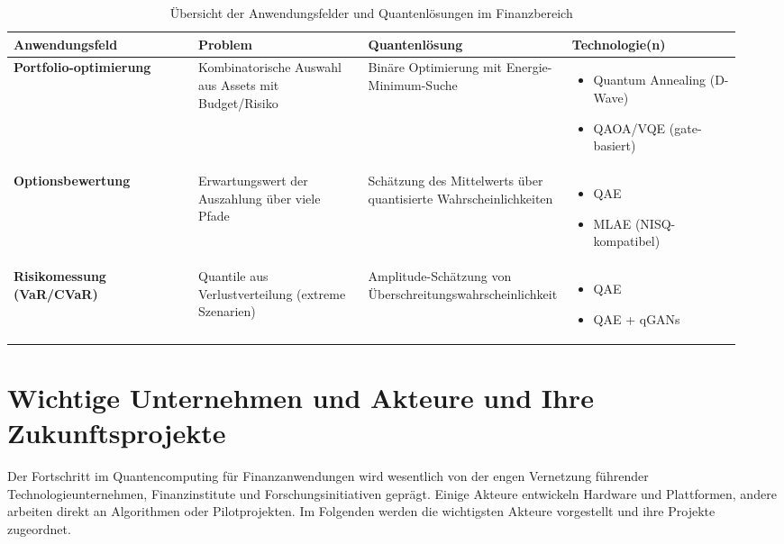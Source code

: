 \begin{table}[!htbp]
\centering
\renewcommand{\arraystretch}{1.5}
\begin{tabular}{|p{0.25\linewidth}|p{0.23\linewidth}|p{0.23\linewidth}|p{0.23\linewidth}|}
\hline
\textbf{Anwendungsfeld} & \textbf{Problem} & \textbf{Quantenlösung} & \textbf{Technologie(n)} \\
\hline
\textbf{Portfolio-optimierung} & 
Kombinatorische Auswahl aus Assets mit Budget/Risiko & 
Binäre Optimierung mit Energie-Minimum-Suche & 
\begin{minipage}[t]{\linewidth}
\begin{itemize}[leftmargin=*,noitemsep]
  \item Quantum Annealing (D-Wave)
  \item QAOA/VQE (gate-basiert)
\end{itemize}
\end{minipage} \\
\hline
\textbf{Optionsbewertung} & 
Erwartungswert der Auszahlung über viele Pfade & 
Schätzung des Mittelwerts über quantisierte Wahrscheinlichkeiten & 
\begin{minipage}[t]{\linewidth}
\begin{itemize}[leftmargin=*,noitemsep]
  \item QAE
  \item MLAE (NISQ-kompatibel)
\end{itemize}
\end{minipage} \\
\hline
\textbf{Risikomessung (VaR/CVaR)} & 
Quantile aus Verlustverteilung (extreme Szenarien) & 
Amplitude-Schätzung von Überschreitungswahrscheinlichkeit & 
\begin{minipage}[t]{\linewidth}
\begin{itemize}[leftmargin=*,noitemsep]
  \item QAE
  \item QAE + qGANs
\end{itemize}
\end{minipage} \\
\hline
\end{tabular}
\caption{Übersicht der Anwendungsfelder und Quantenlösungen im Finanzbereich}
\label{tab:qc_overview}
\end{table}








\section{Wichtige Unternehmen und Akteure und Ihre Zukunftsprojekte}
Der Fortschritt im Quantencomputing für Finanzanwendungen wird wesentlich von der engen Vernetzung führender Technologieunternehmen, Finanzinstitute und Forschungsinitiativen geprägt. Einige Akteure entwickeln Hardware und Plattformen, andere arbeiten direkt an Algorithmen oder Pilotprojekten. Im Folgenden werden die wichtigsten Akteure vorgestellt und ihre Projekte zugeordnet.

